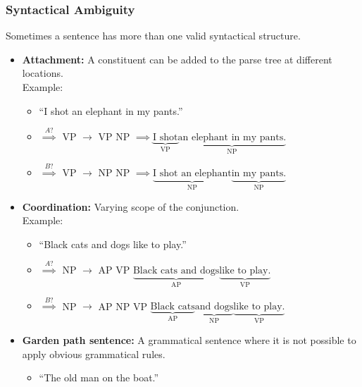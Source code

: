 \documentclass[a4paper, 11pt, accentcolor = tud3b]{tudreport}
\begin{document}
                \subsubsection{Syntactical Ambiguity} %
                	Sometimes a sentence has more than one valid syntactical structure.
                    \begin{itemize}
                    	\item \textbf{Attachment:} A constituent can be added to the parse tree at different locations. \\ Example:
                    		\begin{itemize}
                    			\item \enquote{I shot an elephant in my pants.}
                    			\item[] \( \overset{A?}{\implies} \) VP \(\rightarrow\) VP NP \( \implies \underbrace{\text{I shot}}_{\text{VP}} \underbrace{\text{an elephant in my pants.}}_{\text{NP}} \)
                    			\item[] \( \overset{B?}{\implies} \) VP \(\rightarrow\) NP NP \( \implies \underbrace{\text{I shot an elephant}}_{\text{NP}} \underbrace{\text{in my pants.}}_{\text{NP}} \)
                    		\end{itemize}
                    	\item \textbf{Coordination:} Varying scope of the conjunction. \\ Example:
                    		\begin{itemize}
                    			\item \enquote{Black cats and dogs like to play.}
                    			\item[] \( \overset{A?}{\implies} \) NP \(\rightarrow\) AP VP \( \underbrace{\text{Black cats and dogs}}_{\text{AP}} \underbrace{\text{like to play.}}_{\text{VP}} \)
                    			\item[] \( \overset{B?}{\implies} \) NP \(\rightarrow\) AP NP VP \( \underbrace{\text{Black cats}}_{\text{AP}} \underbrace{\text{and dogs}}_{\text{NP}} \underbrace{\text{like to play.}}_{\text{VP}} \)
                    		\end{itemize}
                    	\item \textbf{Garden path sentence:} A grammatical sentence where it is not possible to apply obvious grammatical rules.
                    		\begin{itemize}
                    			\item \enquote{The old man on the boat.}
                    		\end{itemize}
                    \end{itemize}
                
\end{document}
